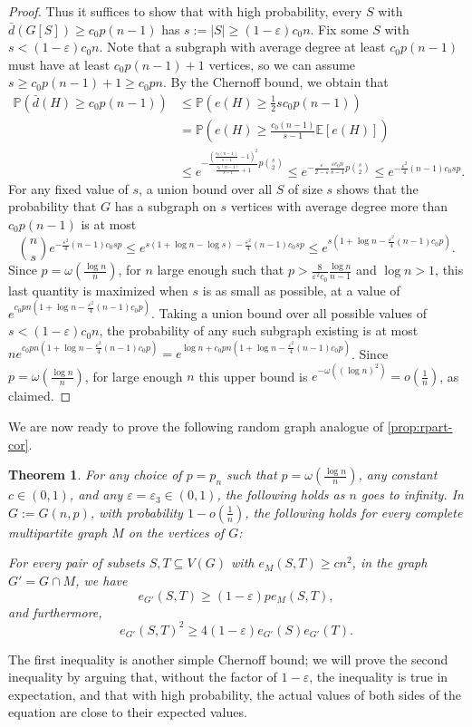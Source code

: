 \documentclass[12pt]{amsart}
\newtheorem{theorem}{Theorem}[section]
\theoremstyle{definition}
\numberwithin{equation}{section}
\newcommand{\EE}{\mathbb{E}}
\newcommand{\PP}{\mathbb{P}}
\begin{document}
\begin{proof}
    Thus it suffices to show that with high probability, every $S$ with $\bar d(G[S])\ge c_0 p(n-1)$ has $s:=|S|\ge (1-\varepsilon)c_0 n$. Fix some $S$ with $s<(1-\varepsilon)c_0 n$. Note that a subgraph with average degree at least $c_0 p(n-1)$ must have at least $c_0 p(n-1)+1$ vertices, so we can assume $s\ge c_0 p(n-1)+1\ge c_0 pn$. 
    By the Chernoff bound, we obtain that 
    \begin{align*}
        \PP(\bar d(H)\ge c_0 p(n-1))&\le \PP(e(H)\ge \frac{1}{2}sc_0 p(n-1)) \\
        &= \PP (e(H)\ge \frac{c_0 (n-1)}{s-1}\EE[e(H)]) \\
        &\le e^{-\frac{\left(\frac{c_0 (n-1)}{s-1}-1\right)^2}{\frac{c_0 (n-1)}{s-1}+1}p\binom{s}{2}} \le e^{-\frac{\varepsilon}{2-\varepsilon}\frac{\varepsilon c_0 n}{s-1}p\binom{s}{2}} \le e^{-\frac{\varepsilon^2}{4}(n-1)c_0sp}.
    \end{align*}
    For any fixed value of $s$, a union bound over all $S$ of size $s$ shows that the probability that $G$ has a subgraph on $s$ vertices with average degree more than $c_0 p(n-1)$ is at most
    \[{n\choose s}e^{-\frac{\varepsilon^2}{4}(n-1)c_0sp} \le e^{s(1+\log n - \log s)-\frac{\varepsilon^2}{4}(n-1)c_0sp} \le e^{s(1+\log n-\frac{\varepsilon^2}{4}(n-1)c_0p)}.\]
    Since $p=\omega(\frac{\log n}{n})$, for $n$ large enough such that $p>\frac{8}{\varepsilon^2 c_0}\frac{\log n}{n-1}$ and $\log n >1$, this last quantity is maximized when $s$ is as small as possible, at a value of $e^{c_0pn(1+\log n-\frac{\varepsilon^2}{4}(n-1)c_0p)}$.
    Taking a union bound over all possible values of $s<(1-\varepsilon)c_0 n$, the probability of any such subgraph existing is at most $ne^{c_0pn(1+\log n-\frac{\varepsilon^2}{4}(n-1)c_0p)} = e^{\log n + c_0pn(1+\log n-\frac{\varepsilon^2}{4}(n-1)c_0p)}$. Since $p=\omega(\frac{\log n}{n})$, for large enough $n$ this upper bound is $e^{-\omega((\log n)^2)}= o(\frac{1}{n})$, as claimed.
\end{proof}

We are now ready to prove the following random graph analogue of \cref{prop:rpart-cor}.
\begin{theorem}
	\label{thm:corollary}
    For any choice of $p=p_n$ such that $p=\omega(\frac{\log n}n)$, any constant $c \in (0, 1)$, and any $\varepsilon = \varepsilon_3\in (0,1)$, the following holds as $n$ goes to infinity. In $G:=G(n,p)$, with probability $1-o(\frac1n)$, the following holds for every complete multipartite graph $M$ on the vertices of $G$:
 
    For every pair of subsets $S, T\subseteq V(G)$ with $e_M(S, T) \ge cn^2$, in the graph $G'=G\cap M$, we have 
    \[
        e_{G'}(S,T)\ge (1-\varepsilon)pe_M(S,T),
    \]
    and furthermore,
    \[e_{G'}(S, T)^2\ge 4(1-\varepsilon)e_{G'}(S) e_{G'}(T).\]
\end{theorem}
The first inequality is another simple Chernoff bound; we will prove the second inequality by arguing that, without the factor of $1-\varepsilon$, the inequality is true 
in expectation, and that with high probability, the actual values of both sides of the equation are close to their expected values.
\end{document}

